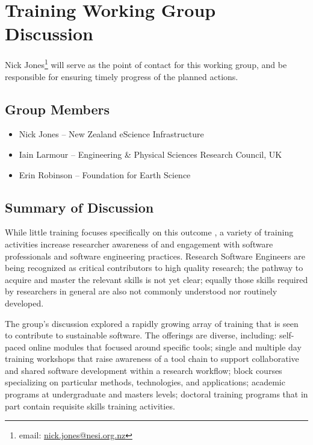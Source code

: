 \section{Training Working Group Discussion}
\label{sec:appendix_training}

Nick Jones\footnote{email:
\href{mailto:nick.jones@nesi.org.nz}{nick.jones@nesi.org.nz}} will serve as the
point of contact for this working group, and be responsible for ensuring timely
progress of the planned actions.

\subsection{Group Members}
\begin{itemize}
\item Nick Jones -- New Zealand eScience Infrastructure
\item Iain Larmour -- Engineering \& Physical Sciences Research Council, UK
\item Erin Robinson -- Foundation for Earth Science
\end{itemize}

\subsection{Summary of Discussion}


While little training focuses specifically on this outcome , a variety of training activities increase researcher awareness of
and engagement with software professionals and software engineering practices.
Research Software Engineers are being recognized as critical contributors to
high quality research; the pathway to acquire and master the relevant skills
is not yet clear; equally those skills required by researchers in general are
also not commonly understood nor routinely developed.

The group's discussion explored a rapidly growing array of training that is seen
to contribute to sustainable software. The offerings are diverse, including:
self-paced online modules that focused around specific tools; single and multiple day
training workshops that raise awareness of a tool chain to support collaborative
and shared software development within a research workflow; block courses
specializing on particular methods, technologies, and applications; academic
programs at undergraduate and masters levels; doctoral training programs that in
part contain requisite skills training activities.

